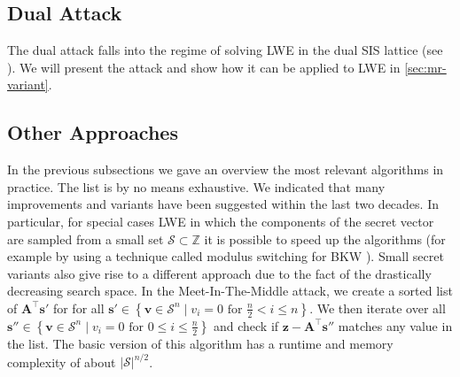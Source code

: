 








\subsection[Dual Attack]{Dual Attack \cite{MR09}} %
The dual attack \cite{MR09} falls into the regime of solving LWE in the dual SIS lattice (see \cite{sec:dual-attacks}). We will present the attack and show how it can be applied to LWE in \cref{sec:mr-variant}.



\subsection{Other Approaches}
In the previous subsections we gave an overview the most relevant algorithms in practice. The list is by no means exhaustive. We indicated that many improvements and variants have been suggested within the last two decades. In particular, for special cases LWE in which the components of the secret vector are sampled from a small set $\mathcal{S} \subset \mathbb{Z}$ it is possible to speed up the algorithms (for example by using a technique called modulus switching for BKW \cite{AFFP14}). %
Small secret variants also give rise to a different approach due to the fact of the drastically decreasing search space. In the Meet-In-The-Middle attack, we create a sorted list of $\mathbf{A}^\intercal \mathbf{s}'$ for for all $\mathbf{s}' \in \left\{ \mathbf{v} \in \mathcal{S}^n \mid v_i = 0 \text{ for } \frac{n}{2} < i \leq n\right\}$. We then iterate over all $\mathbf{s}'' \in \left\{ \mathbf{v} \in \mathcal{S}^n \mid v_i = 0 \text{ for } 0 \leq i \leq \frac{n}{2}\right\}$ and check if $\mathbf{z} - \mathbf{A}^\intercal \mathbf{s}''$ matches any value in the list. The basic version of this algorithm has a runtime and memory complexity of about $|\mathcal{S}|^{n/2}$.

